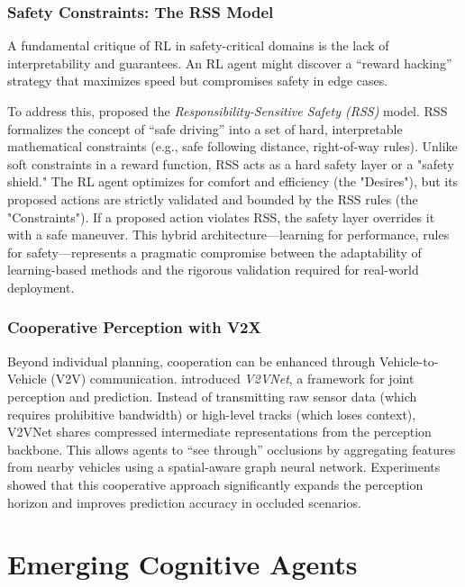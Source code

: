 \documentclass[12pt, a4paper]{article}
\begin{document}
\subsubsection{Safety Constraints: The RSS Model}
A fundamental critique of RL in safety-critical domains is the lack of interpretability and guarantees. An RL agent might discover a ``reward hacking'' strategy that maximizes speed but compromises safety in edge cases.

To address this, \cite{shalev2016safe} proposed the \textit{Responsibility-Sensitive Safety (RSS)} model. RSS formalizes the concept of ``safe driving'' into a set of hard, interpretable mathematical constraints (e.g., safe following distance, right-of-way rules). Unlike soft constraints in a reward function, RSS acts as a hard safety layer or a "safety shield." The RL agent optimizes for comfort and efficiency (the "Desires"), but its proposed actions are strictly validated and bounded by the RSS rules (the "Constraints"). If a proposed action violates RSS, the safety layer overrides it with a safe maneuver. This hybrid architecture—learning for performance, rules for safety—represents a pragmatic compromise between the adaptability of learning-based methods and the rigorous validation required for real-world deployment.

\subsubsection{Cooperative Perception with V2X}
Beyond individual planning, cooperation can be enhanced through Vehicle-to-Vehicle (V2V) communication. \cite{wang2020v2vnet} introduced \textit{V2VNet}, a framework for joint perception and prediction. Instead of transmitting raw sensor data (which requires prohibitive bandwidth) or high-level tracks (which loses context), V2VNet shares compressed intermediate representations from the perception backbone. This allows agents to ``see through'' occlusions by aggregating features from nearby vehicles using a spatial-aware graph neural network. Experiments showed that this cooperative approach significantly expands the perception horizon and improves prediction accuracy in occluded scenarios.

\section{Emerging Cognitive Agents}
\label{sec:cognitive}
\end{document}
